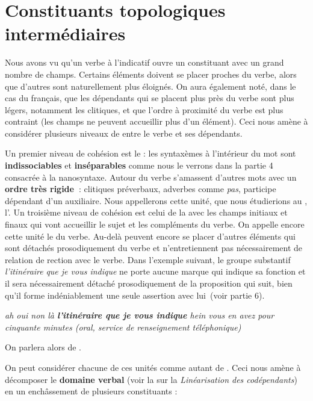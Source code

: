 \section{Constituants topologiques intermédiaires}\label{sec:3.5.34}

Nous avons vu qu’un verbe à l’indicatif ouvre un constituant avec un grand nombre de champs. Certains éléments doivent se placer proches du verbe, alors que d’autres sont naturellement plus éloignés. On aura également noté, dans le cas du français, que les dépendants qui se placent plus près du verbe sont plus légers, notamment les clitiques, et que l’ordre à proximité du verbe est plus contraint (les champs ne peuvent accueillir plus d’un élément). Ceci nous amène à considérer plusieurs niveaux de  entre le verbe et ses dépendants.

Un premier niveau de cohésion est le : les syntaxèmes à l’intérieur du mot sont \textbf{indissociables} et \textbf{inséparables} comme nous le verrons dans la partie 4 consacrée à la nanosyntaxe. Autour du verbe s’amassent d’autres mots avec un \textbf{ordre très rigide~}: clitiques préverbaux, adverbes comme \textit{pas}, participe dépendant d’un auxiliaire. Nous appellerons cette unité, que nous étudierions au , l’. Un troisième niveau de cohésion est celui de la  avec les champs initiaux et finaux qui vont accueillir le sujet et les compléments du verbe. On appelle encore cette unité le  du verbe. Au-delà peuvent encore se placer d’autres éléments qui sont détachés prosodiquement du verbe et n’entretiennent pas nécessairement de relation de rection avec le verbe. Dans l’exemple suivant, le groupe substantif \textit{l’itinéraire} \textit{que je vous indique} ne porte aucune marque qui indique sa fonction et il sera nécessairement détaché prosodiquement de la proposition qui suit, bien qu’il forme indéniablement une seule assertion avec lui~(voir partie 6).

\ea\itshape
 ah oui non là \textbf{{l’itinéraire}  {que je vous indique}}  {hein vous en avez pour cinquante minutes} (oral, service de renseignement téléphonique)
\z

On parlera alors de .

On peut considérer chacune de ces unités comme autant de . Ceci nous amène à décomposer le \textbf{domaine verbal} (voir la  sur la \textit{Linéarisation des codépendants}) en un enchâssement de plusieurs constituants :

